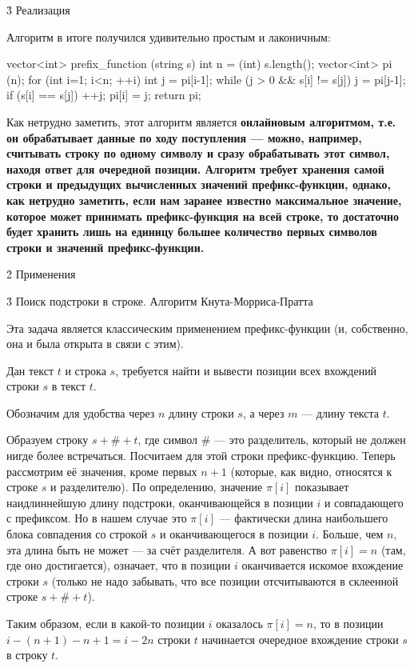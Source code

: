 \h3{ Реализация }

Алгоритм в итоге получился удивительно простым и лаконичным:

\code
vector<int> prefix_function (string s) {
	int n = (int) s.length();
	vector<int> pi (n);
	for (int i=1; i<n; ++i) {
		int j = pi[i-1];
		while (j > 0 && s[i] != s[j])
			j = pi[j-1];
		if (s[i] == s[j])  ++j;
		pi[i] = j;
	}
	return pi;
}
\endcode

Как нетрудно заметить, этот алгоритм является \bf{онлайновым} алгоритмом, т.е. он обрабатывает данные по ходу поступления --- можно, например, считывать строку по одному символу и сразу обрабатывать этот символ, находя ответ для очередной позиции. Алгоритм требует хранения самой строки и предыдущих вычисленных значений префикс-функции, однако, как нетрудно заметить, если нам заранее известно максимальное значение, которое может принимать префикс-функция на всей строке, то достаточно будет хранить лишь на единицу большее количество первых символов строки и значений префикс-функции.


\h2{ Применения }


\h3{ Поиск подстроки в строке. Алгоритм Кнута-Морриса-Пратта }

Эта задача является классическим применением префикс-функции (и, собственно, она и была открыта в связи с этим).

Дан текст $t$ и строка $s$, требуется найти и вывести позиции всех вхождений строки $s$ в текст $t$.

Обозначим для удобства через $n$ длину строки $s$, а через $m$ --- длину текста $t$.

Образуем строку $s + \# + t$, где символ $\#$ --- это разделитель, который не должен нигде более встречаться. Посчитаем для этой строки префикс-функцию. Теперь рассмотрим её значения, кроме первых $n+1$ (которые, как видно, относятся к строке $s$ и разделителю). По определению, значение $\pi[i]$ показывает наидлиннейшую длину подстроки, оканчивающейся в позиции $i$ и совпадающего с префиксом. Но в нашем случае это $\pi[i]$ --- фактически длина наибольшего блока совпадения со строкой $s$ и оканчивающегося в позиции $i$. Больше, чем $n$, эта длина быть не может --- за счёт разделителя. А вот равенство $\pi[i] = n$ (там, где оно достигается), означает, что в позиции $i$ оканчивается искомое вхождение строки $s$ (только не надо забывать, что все позиции отсчитываются в склеенной строке $s+\#+t$).

Таким образом, если в какой-то позиции $i$ оказалось $\pi[i] = n$, то в позиции $i - (n + 1) - n + 1 = i - 2 n$ строки $t$ начинается очередное вхождение строки $s$ в строку $t$.

